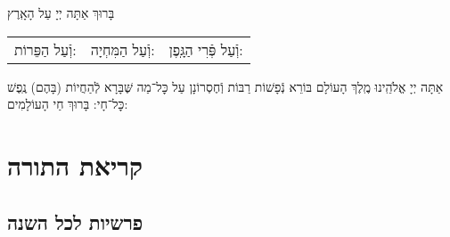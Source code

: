 \documentclass[twoside, openany, parskip=half, 11pt]{book}
\begin{document}
בָּרוּךְ אַתָּה יְיָ עַל הָאָֽרֶץ

\begin{tabular}{c|c|c}
וְֿעַל הַפֵּרוֹת: & וְֿעַל הַמִּחְיָה: & וְֿעַל פְּֿרִי הַגָּֽפֶן:
\end{tabular}
\medskip

\sepline

\vspace{\baselineskip}

אַתָּה יְיָ אֱלֹהֵֽינוּ מֶֽלֶךְ הָעוֹלָם בּוֹרֵא נְֿפָשׁוֹת רַבּוֹת וְֿחֶסְרוֹנָן
עַל כׇּל־מַה שֶּׁבָּרָא לְֿהַחֲיוֹת (בָּהֶם) נֶֽפֶשׁ כׇּל־חָי: בָּרוּךְ חַי הָעוֹלָמִים:

\chapter[קריאת התורה]{ קריאת התורה }
\label{torah}

\section{פרשיות לכל השנה}
\end{document}
